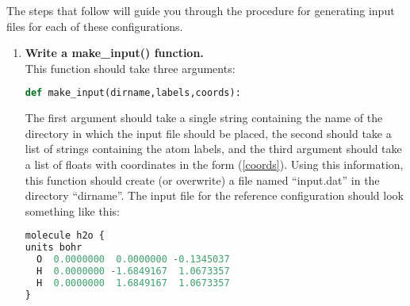 \documentclass[11pt]{article}
\newcommand{\ttf}[1]{{\ttfamily #1}}
\begin{document}
The steps that follow will guide you through the procedure for generating input files for each of these configurations.
\begin{enumerate}[label=\textbf{\arabic*}]
\item {\bf Write a \ttf{make\_input()} function.}\\
This function should take three arguments:
\begin{addmargin}{2cm}{}
\begin{lstlisting}[language=python]
def make_input(dirname,labels,coords):
\end{lstlisting}
\end{addmargin}
The first argument should take a single string containing the name of the directory in which the input file should be placed, the second should take a list of strings containing the atom labels, and the third argument should take a list of \ttf{float}s with coordinates in the form (\ref{coords}).
Using this information, this function should create (or overwrite) a file named ``\ttf{input.dat}'' in the directory ``\ttf{dirname}''.
The input file for the reference configuration should look something like this:
\begin{addmargin}{2cm}{}
\begin{lstlisting}[language=python]
molecule h2o {
units bohr
  O  0.0000000  0.0000000 -0.1345037
  H  0.0000000 -1.6849167  1.0673357
  H  0.0000000  1.6849167  1.0673357
}


\end{lstlisting}
\end{addmargin}
\end{enumerate}
\end{document}
